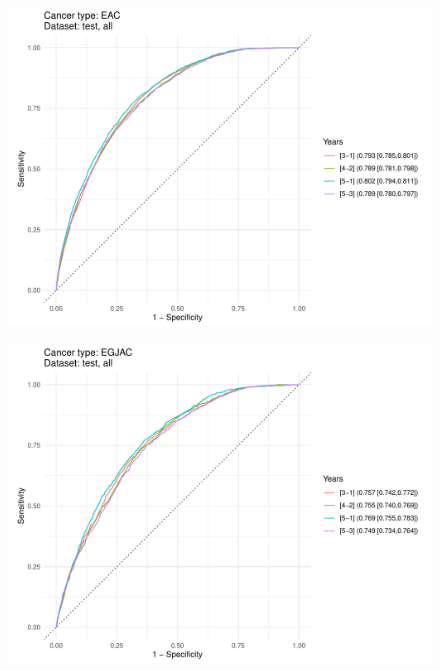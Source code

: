 \documentclass[english]{article}
\begin{document}
\begin{figure}[ht]
\includegraphics[width=1.0\linewidth]{cancerstage/2y_EAC_all.pdf}
\end{figure}


\begin{figure}[ht]
\includegraphics[width=1.0\linewidth]{cancerstage/2y_EGJAC_all.pdf}
\end{figure}
\end{document}
